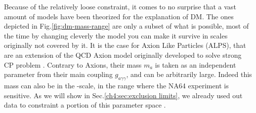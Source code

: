 Because of the relatively loose constraint, it comes to no surprise that a vast amount of models have been theorized for the explanation of DM. The ones depicted in Fig.\ref{fig:dm-mass-range} are only a subset of what is possible, most of the time by changing cleverly the model you can make it survive in scales originally not covered by it. It is the case for Axion Like Particles (ALPS), that are an extension of the QCD Axion model originally developed to solve strong CP problem \cite{PhysRevD.16.1791}. Contrary to Axions, their mass $m_a$ is taken as an independent parameter from their main coupling $g_{a \gamma \gamma}$, and can be arbitrarily large. Indeed this mass can also be in the \mev-\gev scale, in the range where the NA64 experiment is sensitive. As we will show in Sec.\ref{ch4:sec:exclusion limits}, we already used out data to constraint a portion of this parameter space \cite{Banerjee:2020fue}.

